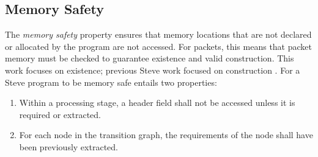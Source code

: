 
%
%

\subsection{Memory Safety} \label{guide:requirements}

The \emph{memory safety} property ensures that memory locations that are not declared or allocated by the program are not accessed. For packets, this means that packet memory must be checked to guarantee existence and valid construction. This work focuses on existence; previous Steve work focused on construction \cite{wripe}.
For a Steve program to be memory safe entails two properties:

\begin{enumerate}
\item Within a processing stage, a header field shall not be accessed unless it is required or extracted.
\item For each node in the transition graph, the requirements of the node shall have been previously extracted.
\end{enumerate}

